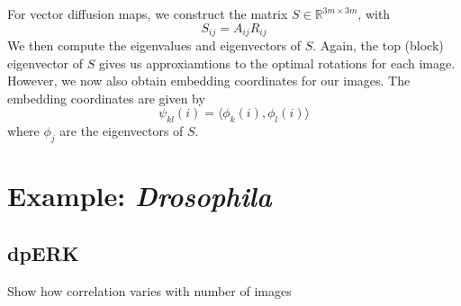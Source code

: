 \documentclass[12pt]{article}
\begin{document}
For vector diffusion maps, we construct the matrix $S \in \mathbb{R}^{3m \times 3m}$, with
\begin{equation}
	S_{ij} = A_{ij} R_{ij}
\end{equation}
%
We then compute the eigenvalues and eigenvectors of $S$.
%
Again, the top (block) eigenvector of $S$ gives us approxiamtions to the optimal rotations for each image.
%
However, we now also obtain embedding coordinates for our images.
%
The embedding coordinates are given by 
\begin{equation}
\psi_{kl} (i) = \langle \phi_k(i), \phi_l(i) \rangle
\end{equation}
where $\phi_j$ are the eigenvectors of $S$.


\section{Example: {\em Drosophila}}

\subsection{dpERK}

Show how correlation varies with number of images
\end{document}
